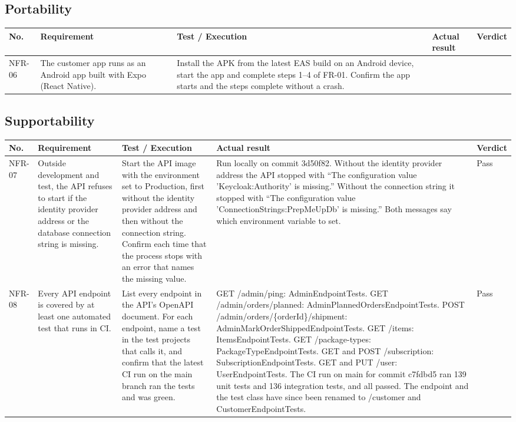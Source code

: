 \documentclass[a4paper,11pt]{article}
\begin{document}
\subsection{Portability}
\begin{center}
\footnotesize
\begin{tabular}{@{}p{1.2cm}p{3.8cm}p{5.8cm}p{1.7cm}p{1.3cm}@{}}
\hline
\textbf{No.} & \textbf{Requirement} & \textbf{Test / Execution} & \textbf{Actual result} & \textbf{Verdict} \\
\hline
NFR-06 & The customer app runs as an Android app built with Expo (React Native). & Install the APK from the latest EAS build on an Android device, start the app and complete steps 1--4 of FR-01. Confirm the app starts and the steps complete without a crash. & & \\
\hline
\end{tabular}
\end{center}

\subsection{Supportability}
\begin{center}
\footnotesize
\begin{tabular}{@{}p{1.2cm}p{3.8cm}p{5.8cm}p{1.7cm}p{1.3cm}@{}}
\hline
\textbf{No.} & \textbf{Requirement} & \textbf{Test / Execution} & \textbf{Actual result} & \textbf{Verdict} \\
\hline
NFR-07 & Outside development and test, the API refuses to start if the identity provider address or the database connection string is missing. & Start the API image with the environment set to Production, first without the identity provider address and then without the connection string. Confirm each time that the process stops with an error that names the missing value. & Run locally on commit 3d50f82. Without the identity provider address the API stopped with ``The configuration value 'Keycloak:Authority' is missing.'' Without the connection string it stopped with ``The configuration value 'ConnectionStrings:PrepMeUpDb' is missing.'' Both messages say which environment variable to set. & Pass \\
\hline
NFR-08 & Every API endpoint is covered by at least one automated test that runs in CI. & List every endpoint in the API's OpenAPI document. For each endpoint, name a test in the test projects that calls it, and confirm that the latest CI run on the main branch ran the tests and was green. & GET /admin/ping: AdminEndpointTests. GET /admin/orders/planned: AdminPlannedOrdersEndpointTests. POST /admin/orders/\{orderId\}/shipment: AdminMarkOrderShippedEndpointTests. GET /items: ItemsEndpointTests. GET /package-types: PackageTypeEndpointTests. GET and POST /subscription: SubscriptionEndpointTests. GET and PUT /user: UserEndpointTests. The CI run on main for commit c7fdbd5 ran 139 unit tests and 136 integration tests, and all passed. The endpoint and the test class have since been renamed to /customer and CustomerEndpointTests. & Pass \\
\hline
\end{tabular}
\end{center}
\end{document}

